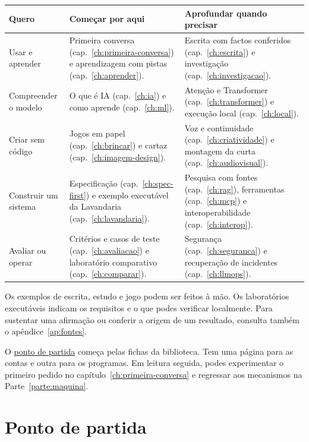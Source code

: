 \begin{center}
\small
\renewcommand{\arraystretch}{1.25}
\begin{tabularx}{\textwidth}{@{}>{\raggedright\arraybackslash}p{}*{2}{>{\raggedright\arraybackslash}X}@{}}
\toprule
Quero & Começar por aqui & Aprofundar quando precisar \\
\midrule
Usar e aprender & Primeira conversa (cap.~\ref{ch:primeira-conversa}) e aprendizagem com pistas (cap.~\ref{ch:aprender}). & Escrita com factos conferidos (cap.~\ref{ch:escrita}) e investigação (cap.~\ref{ch:investigacao}). \\
Compreender o modelo & O que é IA (cap.~\ref{ch:ia}) e como aprende (cap.~\ref{ch:ml}). & Atenção e Transformer (cap.~\ref{ch:transformer}) e execução local (cap.~\ref{ch:local}). \\
Criar sem código & Jogos em papel (cap.~\ref{ch:brincar}) e cartaz (cap.~\ref{ch:imagem-design}). & Voz e continuidade (cap.~\ref{ch:criatividade}) e montagem da curta (cap.~\ref{ch:audiovisual}). \\
Construir um sistema & Especificação (cap.~\ref{ch:spec-first}) e exemplo executável da Lavandaria (cap.~\ref{ch:lavandaria}). & Pesquisa com fontes (cap.~\ref{ch:rag}), ferramentas (cap.~\ref{ch:mcp}) e interoperabilidade (cap.~\ref{ch:interop}). \\
Avaliar ou operar & Critérios e casos de teste (cap.~\ref{ch:avaliacao}) e laboratório comparativo (cap.~\ref{ch:comparar}). & Segurança (cap.~\ref{ch:seguranca}) e recuperação de incidentes (cap.~\ref{ch:llmops}). \\
\bottomrule
\end{tabularx}
\end{center}

Os exemplos de escrita, estudo e jogo podem ser feitos à mão. Os laboratórios executáveis indicam os requisitos e o que podes verificar localmente. Para sustentar uma afirmação ou conferir a origem de um resultado, consulta também o apêndice~\ref{ap:fontes}.

O \hyperref[sec:ponto-de-partida]{ponto de partida} começa pelas fichas da biblioteca. Tem uma página para as contas e outra para os programas. Em leitura seguida, podes experimentar o primeiro pedido no capítulo~\ref{ch:primeira-conversa} e regressar aos mecanismos na Parte~\ref{parte:maquina}.

\chapter*{Ponto de partida}
\label{sec:ponto-de-partida}

